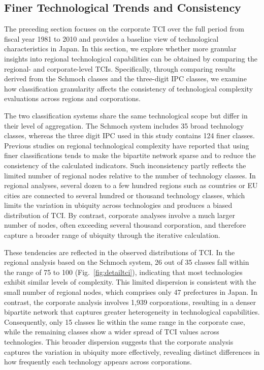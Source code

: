 \subsection*{Finer Technological Trends and Consistency}
{}
\label{subsection:consistency}
The preceding section focuses on the corporate TCI over the full period from fiscal year 1981 to 2010 and provides a baseline view of technological characteristics in Japan. 
In this section, we explore whether more granular insights into regional technological capabilities can be obtained by comparing the regional- and corporate-level TCIs.
Specifically, through comparing results derived from the Schmoch classes and the three-digit IPC classes, we examine how classification granularity affects the consistency of technological complexity evaluations across regions and corporations.

The two classification systems share the same technological scope but differ in their level of aggregation. 
The Schmoch system includes 35 broad technology classes, whereas the three digit IPC used in this study contains 124 finer classes. 
Previous studies on regional technological complexity have reported that using finer classifications tends to make the bipartite network sparse and to reduce the consistency of the calculated indicators\cite{morrison2017economic,Tacchella2012}. 
Such inconsistency partly reflects the limited number of regional nodes relative to the number of technology classes. 
In regional analyses, several dozen to a few hundred regions such as countries or EU cities\cite{Hidalgo2021,nepelski2020technological} are connected to several hundred or thousand technology classes, which limits the variation in ubiquity across technologies and produces a biased distribution of TCI. 
By contrast, corporate analyses involve a much larger number of nodes, often exceeding several thousand corporation, and therefore capture a broader range of ubiquity through the iterative calculation.

These tendencies are reflected in the observed distributions of TCI.
In the regional analysis based on the Schmoch system, 26 out of 35 classes fall within the range of 75 to 100 (Fig.~\ref{fig:detailtci}), indicating that most technologies exhibit similar levels of complexity.
This limited dispersion is consistent with the small number of regional nodes, which comprises only 47 prefectures in Japan.
In contrast, the corporate analysis involves 1,939 corporations, resulting in a denser bipartite network that captures greater heterogeneity in technological capabilities.
Consequently, only 15 classes lie within the same range in the corporate case, while the remaining classes show a wider spread of TCI values across technologies.
This broader dispersion suggests that the corporate analysis captures the variation in ubiquity more effectively, revealing distinct differences in how frequently each technology appears across corporations.

